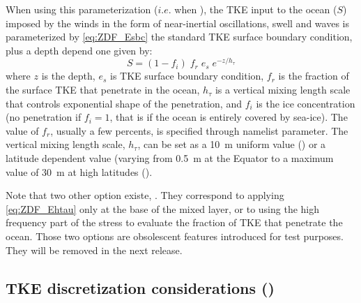 \documentclass[../main/NEMO_manual]{subfiles}
\begin{document}
When using this parameterization ($i.e.$ when ),
the TKE input to the ocean ($S$) imposed by the winds in the form of near-inertial oscillations,
swell and waves is parameterized by \autoref{eq:ZDF_Esbc} the standard TKE surface boundary condition,
plus a depth depend one given by:
\begin{equation}
  \label{eq:ZDF_Ehtau}
  S = (1-f_i) \; f_r \; e_s \; e^{-z / h_\tau}
\end{equation}
where $z$ is the depth, $e_s$ is TKE surface boundary condition, $f_r$ is the fraction of the surface TKE that
penetrate in the ocean, $h_\tau$ is a vertical mixing length scale that controls exponential shape of
the penetration, and $f_i$ is the ice concentration
(no penetration if $f_i=1$, that is if the ocean is entirely covered by sea-ice).
The value of $f_r$, usually a few percents, is specified through  namelist parameter.
The vertical mixing length scale, $h_\tau$, can be set as a 10~m uniform value () or
a latitude dependent value (varying from 0.5~m at the Equator to a maximum value of 30~m at high latitudes
(). 

Note that two other option existe, .
They correspond to applying \autoref{eq:ZDF_Ehtau} only at the base of the mixed layer,
or to using the high frequency part of the stress to evaluate the fraction of TKE that penetrate the ocean. 
Those two options are obsolescent features introduced for test purposes.
They will be removed in the next release. 


\subsection{TKE discretization considerations (\protect{})}
\label{subsec:ZDF_tke_ene}
\end{document}
